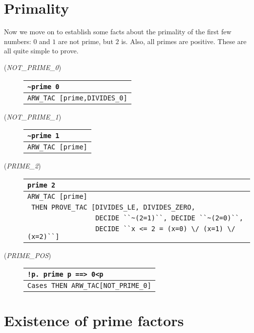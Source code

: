 \section{Primality}

Now we move on to establish some facts about the primality of the
first few numbers: $0$ and $1$ are not prime, but $2$ is. Also, all
primes are positive. These are all quite simple to prove.

\begin{description}

\item [\small{({\it NOT\_PRIME\_0\/})}]
\begin{tabular}[t]{l}
\verb+~prime 0+ \\ \hline
\verb+ARW_TAC [prime,DIVIDES_0]+ \\
\end{tabular}

\item [\small{({\it NOT\_PRIME\_1\/})}]
\begin{tabular}[t]{l}
\verb+~prime 1+ \\ \hline
\verb+ARW_TAC [prime]+ \\
\end{tabular}

\item [\small{({\it PRIME\_2\/})}]
\begin{tabular}[t]{l}
\verb+prime 2+ \\ \hline
\verb+ARW_TAC [prime]+ \\
\verb+ THEN PROVE_TAC [DIVIDES_LE, DIVIDES_ZERO,+ \\
\verb+                 DECIDE ``~(2=1)``, DECIDE ``~(2=0)``,+ \\
\verb+                 DECIDE ``x <= 2 = (x=0) \/ (x=1) \/ (x=2)``]+ \\
\end{tabular}

\item [\small{({\it PRIME\_POS\/})}]
\begin{tabular}[t]{l}
\verb+!p. prime p ==> 0<p+ \\ \hline
\verb+Cases THEN ARW_TAC[NOT_PRIME_0]+ \\
\end{tabular}
\end{description}

\section{Existence of prime factors}

